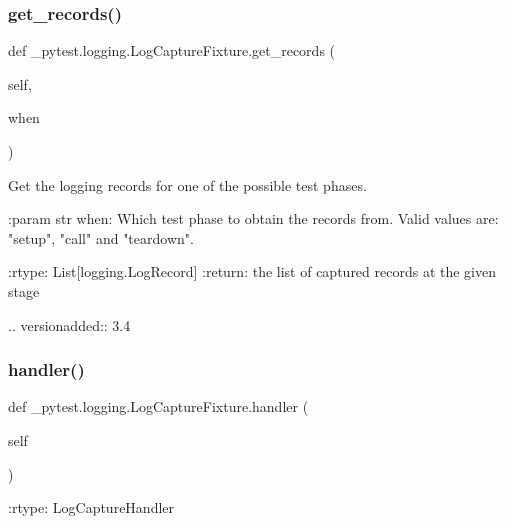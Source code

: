 \subsubsection{\texorpdfstring{get\+\_\+records()}{get\_records()}}
{\footnotesize\ttfamily def \+\_\+pytest.\+logging.\+Log\+Capture\+Fixture.\+get\+\_\+records (\begin{DoxyParamCaption}\item[{}]{self,  }\item[{}]{when }\end{DoxyParamCaption})}

\begin{DoxyVerb}Get the logging records for one of the possible test phases.

:param str when:
    Which test phase to obtain the records from. Valid values are: "setup", "call" and "teardown".

:rtype: List[logging.LogRecord]
:return: the list of captured records at the given stage

.. versionadded:: 3.4
\end{DoxyVerb}
 \mbox{\label{class__pytest_1_1logging_1_1_log_capture_fixture_ad233a808ae98380a9eda47f4cc0a7fe0}} 
\subsubsection{\texorpdfstring{handler()}{handler()}}
{\footnotesize\ttfamily def \+\_\+pytest.\+logging.\+Log\+Capture\+Fixture.\+handler (\begin{DoxyParamCaption}\item[{}]{self }\end{DoxyParamCaption})}

\begin{DoxyVerb}:rtype: LogCaptureHandler
\end{DoxyVerb}
 \mbox{\label{class__pytest_1_1logging_1_1_log_capture_fixture_a09facf7b01bf03f51314819d58882d2e}} 
